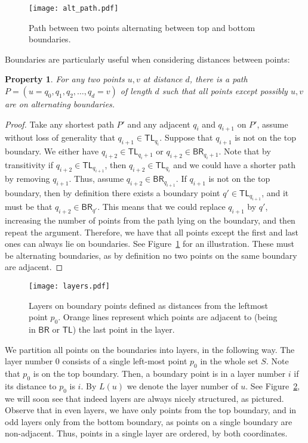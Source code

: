 \documentclass[a4paper,11pt]{article}
\newcommand{\BR}{\mathsf{BR}}
\newcommand{\TL}{\mathsf{TL}}
\newtheorem{property}[theorem]{Property}
\begin{document}
\begin{figure}[h]
\begin{center}
  \texttt{[image: alt\_path.pdf]}
\end{center}
\caption{Path between two points alternating between top and bottom boundaries.}
\label{Fig:AltPaths}
\end{figure}

Boundaries are particularly useful when considering distances between points:
\begin{property}
For any two points $u,v$ at distance $d$, there is a path $P=(u=q_0,q_1,q_2,\ldots,q_d=v)$ of length $d$
such that all points except possibly $u,v$ are on alternating boundaries.
\label{Prop:Bounds}
\end{property}
\begin{proof}
Take any shortest path $P'$ and any adjacent $q_i$ and $q_{i+1}$ on $P'$, assume without loss of generality that $q_{i+1} \in \TL_{q_i}$.
Suppose that $q_{i+1}$ is not on the top boundary.
We either have $q_{i+2} \in \TL_{q_i+1}$ or $q_{i+2} \in \BR_{q_i+1}$.
Note that by transitivity if $q_{i+2} \in \TL_{q_{i+1}}$, then $q_{i+2} \in \TL_{q_i}$ and we could have a shorter path by removing $q_{i+1}$.
Thus, assume $q_{i+2} \in \BR_{q_{i+1}}$.
If $q_{i+1}$ is not on the top boundary, then by definition there exists a boundary point $q' \in \TL_{q_{i+1}}$,
and it must be that $q_{i+2} \in \BR_{q'}$.
This means that we could replace $q_{i+1}$ by $q'$, increasing the number of points from the path lying on the boundary, and then repeat the argument.
Therefore, we have that all points except the first and last ones can always lie on boundaries.
See Figure~\ref{Fig:AltPaths} for an illustration.
These must be alternating boundaries, as by definition no two points on the same boundary are adjacent.
\end{proof}

\begin{figure}[h]
\begin{center}
  \texttt{[image: layers.pdf]}
\end{center}
\caption{Layers on boundary points defined as distances from the leftmost point $p_0$.
Orange lines represent which points are adjacent to (being in $\BR$ or $\TL$) the last point in the layer.}
\label{Fig:Layers}
\end{figure}

We partition all points on the boundaries into layers, in the following way.
The layer number $0$ consists of a single left-most point $p_0$ in the whole set $S$.
Note that $p_0$ is on the top boundary.
Then, a boundary point is in a layer number $i$ if its distance to $p_0$ is $i$.
By $L(u)$ we denote the layer number of $u$.
See Figure~\ref{Fig:Layers}, we will soon see that indeed layers are always nicely structured, as pictured.
Observe that in even layers, we have only points from the top boundary, and in odd layers only from the bottom boundary,
as points on a single boundary are non-adjacent.
Thus, points in a single layer are ordered, by both coordinates.
\end{document}
